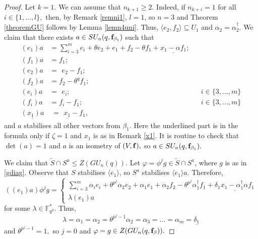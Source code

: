 \begin{proof}
Let $k=1.$ We can assume that $n_{k+1}\ge 2$. Indeed, if  $n_{k+i}=1$ for all $i \in \{1, \ldots, l\},$ then,  by Remark \ref{remni1}, $l=1$, so $n=3$ and Theorem \ref{theoremGU} follows by Lemma \ref{lemn4uni}. Thus, $\langle e_2, f_2 \rangle \subseteq U_1$ and $\alpha_2=\alpha_2^{\dagger}.$ We claim that there exists  $a \in SU_n(q, {\bf f}_{\beta_1})$ such that 
\begin{equation}
\label{465}
\begin{aligned}
(e_1)a & =    \sum_{i=3}^m e_i +\theta e_2+ e_1 +f_2-\theta f_1 + \underline{x_1 -\alpha f_1}; \\  (f_1)a & =f_1;  \\
(e_{2})a & =  \phantom{(} e_{2}-f_1; \\  (f_{2})a & =f_{2}- \theta^q f_1; &&   \\
(e_{i})a  & = \phantom{(} e_{i}; && i \in \{3, \ldots, m \}\\  (f_{i})a & =f_{i} -  f_{1}; && i \in \{3, \ldots, m \}   \\
\underline{(x_1)a} & \underline{ \; = \phantom{(}x_1-f_1}, 
\end{aligned}
\end{equation}
and $a$ stabilises all other vectors from $\beta_1.$ Here the underlined part is in the formula only if ${\zeta}=1$ and $x_1$ is as in Remark \ref{x1}. %
It is routine to check that $\det(a)=1$ and $a$ is an isometry of $(V, {\bf f}),$ so $a \in SU_n(q,{\bf f}_{\beta_1}).$ 

We claim that $\tilde{S} \cap S^a \le Z(GU_n(q)).$ Let $\varphi= \phi^jg \in \tilde{S} \cap S^a$, where $g$ is as in \eqref{gdiag}. Observe that $S$ stabilises  $\langle e_1\rangle$, so $S^a$ stabilises $\langle e_1\rangle a.$ Therefore, 
\begin{equation}
((e_1)a)\phi^j g=
\begin{cases}
\sum_{i=3}^m\alpha_i e_i +\theta^{p^j}\alpha_2 e_2 + \alpha_1e_1 + \alpha_2 f_2 -\theta^{p^j}\alpha_1^{\dagger} f_1+ \underline{\delta_1 x_1 -\alpha_1^{\dagger} \alpha f_1}\\
\lambda (e_1)a
\end{cases}
\end{equation}
for some $\lambda \in \mathbb{F}_{q^2}^*.$  Thus, $$\lambda=\alpha_1=\alpha_2=\theta^{p^j-1}\alpha_2=\alpha_{3}=\ldots=\alpha_m=\underline{\delta_1}$$
and $\theta^{p^j-1}=1,$ so $j=0$ and $\varphi =g \in Z(GU_n(q, {\bf f}_{\beta})).$


\end{proof}
